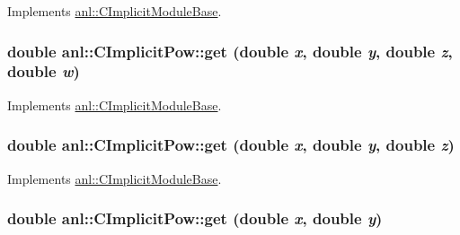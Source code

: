 Implements \hyperlink{classanl_1_1CImplicitModuleBase_aa40b7d54572197612a4fea44b63447eb}{anl::CImplicitModuleBase}.\hypertarget{classanl_1_1CImplicitPow_a541948e854797b149ff0c9a29599d50d}{
\subsubsection[{get}]{\setlength{\rightskip}{0pt plus 5cm}double anl::CImplicitPow::get (double {\em x}, \/  double {\em y}, \/  double {\em z}, \/  double {\em w})}}
\label{classanl_1_1CImplicitPow_a541948e854797b149ff0c9a29599d50d}


Implements \hyperlink{classanl_1_1CImplicitModuleBase_a3cf520bdab59631864253c03b4e1723f}{anl::CImplicitModuleBase}.\hypertarget{classanl_1_1CImplicitPow_aad892840e7a9570d4ae0441cfbe61c4e}{
\subsubsection[{get}]{\setlength{\rightskip}{0pt plus 5cm}double anl::CImplicitPow::get (double {\em x}, \/  double {\em y}, \/  double {\em z})}}
\label{classanl_1_1CImplicitPow_aad892840e7a9570d4ae0441cfbe61c4e}


Implements \hyperlink{classanl_1_1CImplicitModuleBase_ac17d592612c82ba3d47f9229a00b1fe3}{anl::CImplicitModuleBase}.\hypertarget{classanl_1_1CImplicitPow_af8b092909ba5aaf13ce199477613a9e0}{
\subsubsection[{get}]{\setlength{\rightskip}{0pt plus 5cm}double anl::CImplicitPow::get (double {\em x}, \/  double {\em y})}}
\label{classanl_1_1CImplicitPow_af8b092909ba5aaf13ce199477613a9e0}


